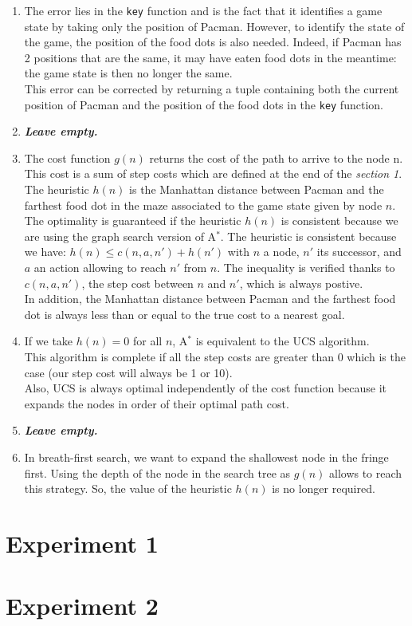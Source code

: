 \documentclass{article}
\begin{document}
\begin{enumerate}[label=\alph*.,leftmargin=1.35em]
    \item The error lies in the \texttt{key} function and is the fact that it identifies a game state by taking only the position of Pacman. However, to identify the state of the game, the position of the food dots is also needed. Indeed, if Pacman has 2 positions that are the same, it may have eaten food dots in the meantime: the game state is then no longer the same.\\
          This error can be corrected by returning a tuple containing both the current position of Pacman and the position of the food dots in the \texttt{key} function.  
    \item \textbf{{\it Leave empty.}}
    \item The cost function $g(n)$ returns the cost of the path to arrive to the node n. This cost is a sum of step costs which are defined at the end of the \textit{section 1}.\\
    The heuristic $h(n)$ is the Manhattan distance between Pacman and the farthest food dot in the maze associated to the game state given by node $n$.\\
    The optimality is guaranteed if the heuristic $h(n)$ is consistent because we are using the graph search version of A$^*$. The heuristic is consistent because we have: $h(n) \leq c(n,a,n') + h(n')$ with $n$ a node, $n'$ its successor, and $a$ an action allowing to reach $n'$ from $n$. The inequality is verified thanks to $c(n,a,n')$, the step cost between $n$ and $n'$, which is always postive.\\
    In addition, the Manhattan distance between Pacman and the farthest food dot is always less than or equal to the true cost to a nearest goal.
    \item If we take $h(n) = 0$ for all $n$, A$^*$ is equivalent to the UCS algorithm.\\
    This algorithm is complete if all the step costs are greater than 0 which is the case (our step cost will always be 1 or 10).\\
    Also, UCS is always optimal independently of the cost function because it expands the nodes in order of their optimal path cost.
    \item \textbf{{\it Leave empty.}}
    \item In breath-first search, we want to expand the shallowest node in the fringe first. Using the depth of the node in the search tree as $g(n)$ allows to reach this strategy. So, the value of the heuristic $h(n)$ is no longer required.
\end{enumerate}

\section{Experiment 1}

\section{Experiment 2}

\end{document}
